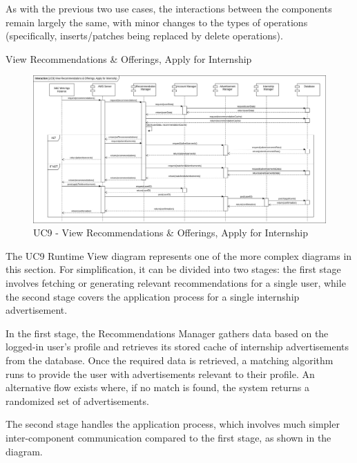 \begin{enumerate}[label={[UC\arabic*]}]
    As with the previous two use cases, the interactions between the components remain largely the same, with minor changes to the types of operations (specifically, inserts/patches being replaced by delete operations).
    
    \item View Recommendations \& Offerings, Apply for Internship
    \begin{figure}[h]
        \centering
        \includegraphics[width=1\linewidth]{DD-Latex//assets//Runtime View Diagrams/UC9.jpg}
        \caption{UC9 - View Recommendations \& Offerings, Apply for Internship}
        \label{fig:UC9}
    \end{figure}

    The UC9 Runtime View diagram represents one of the more complex diagrams in this section. For simplification, it can be divided into two stages: the first stage involves fetching or generating relevant recommendations for a single user, while the second stage covers the application process for a single internship advertisement.

    In the first stage, the Recommendations Manager gathers data based on the logged-in user's profile and retrieves its stored cache of internship advertisements from the database. Once the required data is retrieved, a matching algorithm runs to provide the user with advertisements relevant to their profile. An alternative flow exists where, if no match is found, the system returns a randomized set of advertisements.

    The second stage handles the application process, which involves much simpler inter-component communication compared to the first stage, as shown in the diagram.
    

\end{enumerate}

